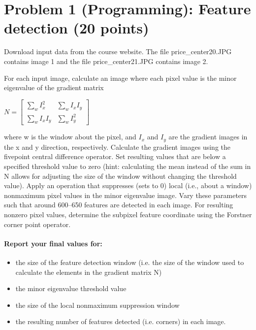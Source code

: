 \documentclass[11pt]{article}
\providecommand{\tightlist}{%
      \setlength{\itemsep}{0pt}\setlength{\parskip}{0pt}}
\begin{document}
    \section{Problem 1 (Programming): Feature detection (20
points)}\label{problem-1-programming-feature-detection-20-points}

Download input data from the course website. The file
price\_center20.JPG contains image 1 and the file price\_center21.JPG
contains image 2.

For each input image, calculate an image where each pixel value is the
minor eigenvalue of the gradient matrix

\(N=\left[ \begin{array}{cc} \sum\limits_w I_x^2 & \sum\limits_w I_x I_y\\ \sum\limits_w I_x I_y & \sum\limits_w I_y^2 \end{array} \right]\)

where w is the window about the pixel, and \(I_x\) and \(I_y\) are the
gradient images in the x and y direction, respectively. Calculate the
gradient images using the fivepoint central difference operator. Set
resulting values that are below a specified threshold value to zero
(hint: calculating the mean instead of the sum in N allows for adjusting
the size of the window without changing the threshold value). Apply an
operation that suppresses (sets to 0) local (i.e., about a window)
nonmaximum pixel values in the minor eigenvalue image. Vary these
parameters such that around 600--650 features are detected in each
image. For resulting nonzero pixel values, determine the subpixel
feature coordinate using the Forstner corner point operator.

\paragraph{Report your final values
for:}\label{report-your-final-values-for}

\begin{itemize}
\tightlist
\item
  the size of the feature detection window (i.e. the size of the window
  used to calculate the elements in the gradient matrix N)
\item
  the minor eigenvalue threshold value
\item
  the size of the local nonmaximum suppression window
\item
  the resulting number of features detected (i.e. corners) in each
  image.
\end{itemize}
\end{document}
